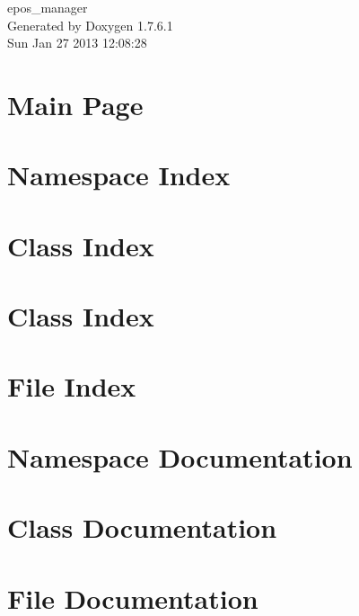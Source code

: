 \documentclass[a4paper]{book}
\begin{document}
\begin{titlepage}
\vspace*{7cm}
\begin{center}
{\Large epos\-\_\-manager }\\
\vspace*{1cm}
{\large \-Generated by Doxygen 1.7.6.1}\\
\vspace*{0.5cm}
{\small Sun Jan 27 2013 12:08:28}\\
\end{center}
\end{titlepage}
\clearemptydoublepage
{}
\tableofcontents
\clearemptydoublepage
{}
\chapter{\-Main \-Page}
\label{index}
\chapter{\-Namespace \-Index}

\chapter{\-Class \-Index}

\chapter{\-Class \-Index}

\chapter{\-File \-Index}

\chapter{\-Namespace \-Documentation}



\chapter{\-Class \-Documentation}








\chapter{\-File \-Documentation}













\printindex
\end{document}
